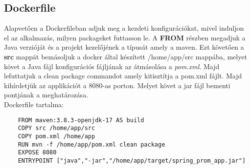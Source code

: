 \subsection{Dockerfile}
Alapvetően a Dockerfileban adjuk meg a kezdeti konfigurációkat, mivel induljon el az alkalmazás, milyen packageket futtasson le.
A \textbf{FROM} részben megadjuk a Java verzióját és a projekt kezelőjének a típusát amely a maven.
Ezt követően a \textbf{src} mappát bemásoljuk a docker által készített /home/app/src mappába, melyet követ a Java fájl konfigurációs fájljának az átmásolása a \textit{pom.xml}.
Majd lefuttatjuk a clean package commandot amely kitisztítja a pom.xml fájlt. Majd kihírdetjük az applikációt a 8080-as porton. Melyet követ a jar fájl bementi pontjának a meghatározása.
\\
Dockerfile tartalma:
\begin{lstlisting}
	FROM maven:3.8.3-openjdk-17 AS build
	COPY src /home/app/src
	COPY pom.xml /home/app
	RUN mvn -f /home/app/pom.xml clean package
	EXPOSE 8080
	ENTRYPOINT ["java","-jar","/home/app/target/spring_prom_app.jar"]
\end{lstlisting}
